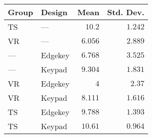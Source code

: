 \begin{tabular}{llrr}
\toprule
Group &   Design &    Mean &  Std. Dev. \\
\midrule
   TS &      --- &  $10.2$ &    $1.242$ \\
   VR &      --- & $6.056$ &    $2.889$ \\
  --- &  Edgekey & $6.768$ &    $3.525$ \\
  --- &   Keypad & $9.304$ &    $1.831$ \\
   VR &  Edgekey &     $4$ &     $2.37$ \\
   VR &   Keypad & $8.111$ &    $1.616$ \\
   TS &  Edgekey & $9.788$ &    $1.393$ \\
   TS &   Keypad & $10.61$ &    $0.964$ \\
\bottomrule
\end{tabular}
